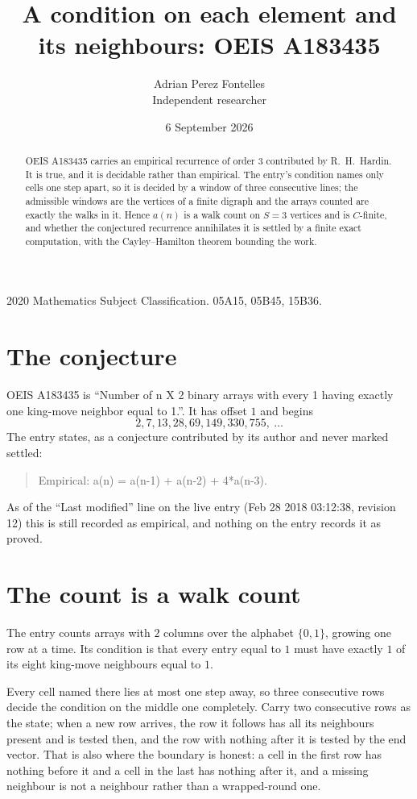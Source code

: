 \documentclass[11pt,a4paper]{article}
\title{A condition on each element and its neighbours: OEIS A183435}
\author{Adrian Perez Fontelles\\ \small Independent researcher}
\date{6 September 2026}
\theoremstyle{plain}
\theoremstyle{definition}
\begin{document}
\maketitle

\begin{abstract}
OEIS A183435 carries an empirical recurrence of order $3$ contributed by R.~H.~Hardin. It is
true, and it is decidable rather than empirical. The entry's condition names only cells one step apart, so it is decided by a window of
three consecutive lines; the
admissible windows are the vertices of a finite digraph and the arrays counted are exactly the
walks in it. Hence $a(n)$ is a walk count on $S=3$ vertices and is $C$-finite, and whether the
conjectured recurrence annihilates it is settled by a finite exact computation, with the
Cayley--Hamilton theorem bounding the work.
\end{abstract}

\noindent\small 2020 Mathematics Subject Classification. 05A15, 05B45, 15B36.\normalsize

\section{The conjecture}

OEIS A183435 is ``Number of n X 2 binary arrays with every 1 having exactly one king-move neighbor equal to 1.''. It has offset $1$ and begins
\[
2, 7, 13, 28, 69, 149, 330, 755,\ \dots
\]
The entry states, as a conjecture contributed by its author and never marked settled:
\begin{quote}
Empirical: a(n) = a(n-1) + a(n-2) + 4*a(n-3).
\end{quote}
As of the ``Last modified'' line on the live entry (Feb 28 2018 03:12:38, revision 12) this is still
recorded as empirical, and nothing on the entry records it as proved.

\section{The count is a walk count}

The entry counts arrays with $2$ columns over the alphabet $\{0,1\}$, growing one row at a time. Its condition is that every entry equal to $1$ must have exactly $1$ of its eight king-move neighbours equal to $1$.

Every cell named there lies at most one step away, so three consecutive rows decide the condition on the middle one completely. Carry two consecutive rows as the state; when a new row arrives, the row it follows has all its neighbours present and is tested then, and the row with nothing after it is tested by the end vector. That is also where the boundary is honest: a cell in the first row has nothing before it and a cell in the last has nothing after it, and a missing neighbour is not a neighbour rather than a wrapped-round one.
\end{document}
